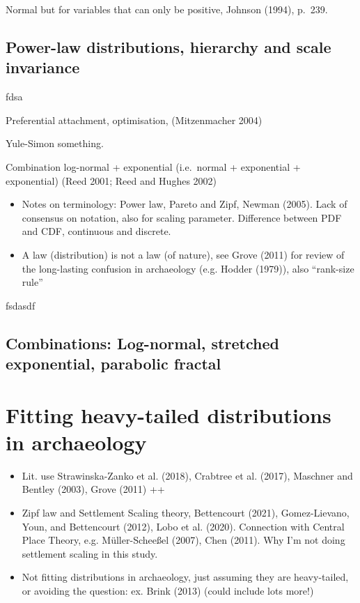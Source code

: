 \documentclass[
  12pt,
]{book}
\begin{document}
Normal but for variables that can only be positive, Johnson (1994), p.~239.

\FloatBarrier

\hypertarget{power-law-distributions-hierarchy-and-scale-invariance}{%
\subsection{Power-law distributions, hierarchy and scale invariance}\label{power-law-distributions-hierarchy-and-scale-invariance}}

fdsa

Preferential attachment, optimisation, (Mitzenmacher 2004)

Yule-Simon something.

Combination log-normal + exponential (i.e.~normal + exponential + exponential) (Reed 2001; Reed and Hughes 2002)

\begin{itemize}
\item
  Notes on terminology: Power law, Pareto and Zipf, Newman (2005). Lack of consensus on notation, also for scaling parameter. Difference between PDF and CDF, continuous and discrete.
\item
  A law (distribution) is not a law (of nature), see Grove (2011) for review of the long-lasting confusion in archaeology (e.g. Hodder (1979)), also ``rank-size rule''
\end{itemize}

fsdasdf

\hypertarget{combinations-log-normal-stretched-exponential-parabolic-fractal}{%
\subsection{Combinations: Log-normal, stretched exponential, parabolic fractal}\label{combinations-log-normal-stretched-exponential-parabolic-fractal}}

\hypertarget{distfit-archaeo}{%
\section{Fitting heavy-tailed distributions in archaeology}\label{distfit-archaeo}}

\begin{itemize}
\item
  Lit. use Strawinska-Zanko et al. (2018), Crabtree et al. (2017), Maschner and Bentley (2003), Grove (2011) ++
\item
  Zipf law and Settlement Scaling theory, Bettencourt (2021), Gomez-Lievano, Youn, and Bettencourt (2012), Lobo et al. (2020). Connection with Central Place Theory, e.g. Müller-Scheeßel (2007), Chen (2011). Why I'm not doing settlement scaling in this study.
\item
  Not fitting distributions in archaeology, just assuming they are heavy-tailed, or avoiding the question: ex. Brink (2013) (could include lots more!)
\end{itemize}
\end{document}
